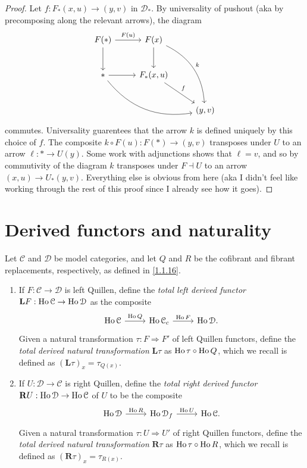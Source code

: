 \begin{proof}
	Let $f : F_*(x,u) \to (y,v)$ in $\mathcal{D} _*$. By universality of pushout (aka by precomposing along the relevant arrows), the diagram
	\[\begin{tikzcd}[row sep = 2.5em, column sep = 2.5em]
	F(*)\ar[" F(u) ", r] \ar[d]  & F(x)\ar[d] \ar[" k ", bend left, ddr]  &  \\
	*\ar[r] \ar[bend right, drr]  & F_*(x,u)\ar[" f ", dr]  &  \\
	 &  & (y,v)
	\end{tikzcd}\]
	commutes. Universality guarentees that the arrow $k$ is defined uniquely by this choice of $f$. The composite $k\circ F(u): F(*) \to (y,v)$ transposes under $U$ to an arrow $\ell : * \to U(y)$. Some work with adjunctions shows that $\ell =v$, and so by commutivity of the diagram $k$ transposes under $F\dashv U$ to an arrow $(x,u)\to U_*(y,v)$. Everything else is obvious from here (aka I didn't feel like working through the rest of this proof since I already see how it goes).
\end{proof}

\section{Derived functors and naturality}

\begin{definition}\label{3.2.1}
	 Let $\mathcal{C} $ and $\mathcal{D} $ be model categories, and let $Q$ and $R$ be the cofibrant and fibrant replacements, respectively, as defined in \cref{1.1.16}.
	\begin{enumerate}
		\item If $F : \mathcal{C}  \to \mathcal{D} $ is left Quillen, define the \emph{total left derived functor} $\mathbf{L} F : \operatorname{Ho} \mathcal{C}  \to \operatorname{Ho} \mathcal{D} $ as the composite
			\[\begin{tikzcd}[row sep = 2.5em, column sep = 2.5em]
			\Ho \mathcal{C} \ar[" \Ho Q ", r]  & \Ho \mathcal{C} _c \ar[" \Ho F ", r]  & \Ho \mathcal{D} .
			\end{tikzcd}\]
			Given a natural transformation $\tau : F \Rightarrow F'$ of left Quillen functors, define the \emph{total derived natural transformation} $\mathbf{L} \tau$ as $\operatorname{Ho} \tau \circ \operatorname{Ho} Q$, which we recall is defined as $(\mathbf{L} \tau)_x = \tau_{Q(x)} $.
		\item If $U : \mathcal{D}  \to \mathcal{C} $ is right Quillen, define the \emph{total right derived functor} $\mathbf{R} U : \operatorname{Ho} \mathcal{D}  \to \operatorname{Ho} \mathcal{C} $ of $U$ to be the composite
			\[\begin{tikzcd}[row sep = 2.5em, column sep = 2.5em]
			\Ho \mathcal{D} \ar[" \Ho R ", r]  & \Ho \mathcal{D} _f \ar[" \Ho U ", r]  & \Ho \mathcal{C} . 
			\end{tikzcd}\]
			Given a natural transformation $\tau : U \Rightarrow U'$ of right Quillen functors, define the \emph{total derived natural transformation} $\mathbf{R} \tau$ as $\operatorname{Ho} \tau\circ \operatorname{Ho} R$, which we recall is defined as $(\mathbf{R} \tau)_x=\tau_{R(x)} $.
	\end{enumerate}
\end{definition}

